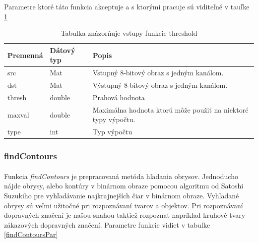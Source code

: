 \documentclass[12pt]{article}
\begin{document}
Parametre ktoré táto funkcia akceptuje a s ktorými pracuje sú viditeľné v tauľke \ref{thresholdPar}
\cite{OpenCVDoc}
\begin{table}
	\centering
    \begin{tabular}{ | l | l | p{5cm} |}
    \hline
    Premenná & Dátový typ & Popis \\ \hline
    src & Mat & Vstupný 8-bitový obraz s jedným kanálom. \\ \hline
    dst & Mat & Výstupný 8-bitový obraz s jedným kanálom. \\ \hline
    thresh & double & Prahová hodnota \\ \hline
    maxval & double & Maximálna hodnota ktorú môže použiť na niektoré typy výpočtu. \\ \hline
    type & int & Typ výpočtu \\
    \hline
    \end{tabular}
  	\caption{Tabulka znázorňuje vstupy funkcie threshold}
  	\label{thresholdPar}
\end{table}
\subsubsection{findContours}
\paragraph{}
Funkcia \emph{findContours} je prepracovaná metóda hľadania obrysov. Jednoducho nájde obrysy, alebo kontúry v binárnom obraze pomocou algoritmu od Satoshi Suzukiho pre vyhľadávanie najkrajnejších čiar v binárnom obraze.
Vyhľadané obrysy sú veľmi užitočné pri rozpoznávaní tvarov a objektov. Pri rozpoznávaní dopravných značení je našou snahou taktiež rozpoznať napríklad kruhové tvary zákazových dopravných značení. Parametre funkcie vidiet v tabuľke \ref{findContoursPar}
\cite{OpenCVDoc}
\end{document}
